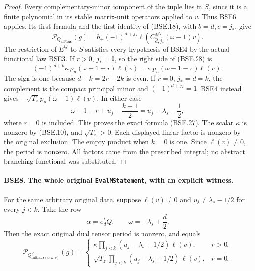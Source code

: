 \begin{proof}
Every complementary-minor component of the tuple lies in $S$,
since it is a finite polynomial in its stable matrix-unit
operators applied to $v$.  Thus BSE6 applies.
Its first formula and the first identity of (BSE.18), with
$b=d,c=j_*$, give
\[
 \mathcal P_{Q_{\texttt{nnPlus}}}(g)
       =b_+(-1)^{d+j_*}
                 \ell\!\left(C^{E^Q}_{\widehat d,\widehat{j_*}}
                                           (\omega-1)v\right).
 \tag{BSE.28}
\]
The restriction of $E^Q$ to $S$ satisfies every hypothesis of
BSE4 by the actual functional law BSE3.
If $r>0$, $j_*=0$, so the right side of (BSE.28) is
\[
       (-1)^{d+k}\kappa\,p_u(\omega-1-r)\ell(v)
                              =\kappa\,p_u(\omega-1-r)\ell(v).
 \tag{BSE.29}
\]
The sign is one because $d+k=2r+2k$ is even.
If $r=0$, $j_*=d=k$, the complement is the compact principal
minor and $(-1)^{d+j_*}=1$.
BSE4 instead gives $-\sqrt{T_z}p_u(\omega-1)\ell(v)$.
In either case
\[
 \omega-1-r+u_j-\frac{k-1}{2}
                                  =u_j-\lambda_s-\frac12,
 \tag{BSE.30}
\]
where $r=0$ is included.  This proves the exact formula (BSE.27).
The scalar $\kappa$ is nonzero by (BSE.10), and $\sqrt{T_z}>0$.
Each displayed linear factor is nonzero by the original exclusion.
The empty product when $k=0$ is one.
Since $\ell(v)\ne0$, the period is nonzero.
All factors came from the prescribed integral; no abstract
branching functional was substituted.
\end{proof}

\paragraph{BSE8. The whole original \texttt{EvalMStatement}, with an explicit witness.}
\label{claim:BSE8}
For the same arbitrary original data, suppose $\ell(v)\ne0$ and
$u_j\ne\lambda_s-1/2$ for every $j<k$.
Take the row
\[
                    \alpha=e_d^tQ,\qquad
                    \omega=-\lambda_s+\frac d2 .
 \tag{BSE.31}
\]
Then the exact original dual tensor period is nonzero, and equals
\[
 \mathcal P_{Q^\vee_{\texttt{nnMinus}(\alpha,\omega,v)}}(g)
   =
 \begin{cases}
 \displaystyle \kappa\prod_{j<k}(u_j-\lambda_s+1/2)\,\ell(v),
                                                    &r>0,\\[2mm]
 \displaystyle \sqrt{T_z}\prod_{j<k}(u_j-\lambda_s+1/2)\,\ell(v),
                                                    &r=0 .
 \end{cases}
 \tag{BSE.32}
\]

